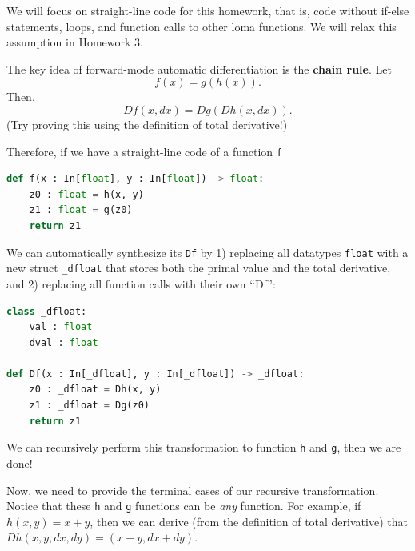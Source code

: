 We will focus on straight-line code for this homework, that is, code without if-else statements, loops, and function calls to other loma functions. We will relax this assumption in Homework 3. 

The key idea of forward-mode automatic differentiation is the \textbf{chain rule}. Let
\begin{equation}
    f(x) = g(h(x)).
\end{equation}
Then,
\begin{equation}
    Df(x, dx) = Dg(Dh(x, dx)).
\end{equation}
(Try proving this using the definition of total derivative!)

Therefore, if we have a straight-line code of a function \lstinline{f}
\begin{lstlisting}[language=Python]
def f(x : In[float], y : In[float]) -> float:
    z0 : float = h(x, y)
    z1 : float = g(z0)
    return z1
\end{lstlisting}
We can automatically synthesize its \lstinline{Df} by 1) replacing all datatypes \lstinline{float} with a new struct \lstinline{_dfloat} that stores both the primal value and the total derivative, and 2) replacing all function calls with their own ``Df'':
\begin{lstlisting}[language=Python]
class _dfloat:
    val : float
    dval : float

def Df(x : In[_dfloat], y : In[_dfloat]) -> _dfloat:
    z0 : _dfloat = Dh(x, y)
    z1 : _dfloat = Dg(z0)
    return z1
\end{lstlisting}
We can recursively perform this transformation to function \lstinline{h} and \lstinline{g}, then we are done!

Now, we need to provide the terminal cases of our recursive transformation. Notice that these \lstinline{h} and \lstinline{g} functions can be \emph{any} function. For example, if $h(x, y) = x + y$, then we can derive (from the definition of total derivative) that $Dh(x, y, dx, dy) = (x + y, dx + dy)$. 

